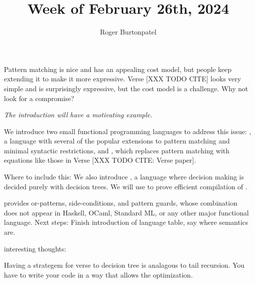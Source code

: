 \documentclass{article}
\title{Week of February 26th, 2024}
\author{Roger Burtonpatel}
\begin{document}
\maketitle

Pattern matching is nice and has an appealing cost model, but people keep
extending it to make it more expressive. Verse [XXX TODO CITE] looks very simple
and is surprisingly expressive, but the cost model is a challenge. Why not look
for a compromise?

\bigskip 
\it{The introduction will have a motivating example.}
\bigskip 



We introduce two small functional programming languages to address this issue:
\PPlus, a language with several of the popular extensions to pattern matching
and minimal syntactic restrictions, and \VMinus, which replaces pattern matching
with equations like those in Verse [XXX TODO CITE: Verse paper]. 

Where to include this: 
We also introduce \D, a language where decision making is decided purely with decision
trees. We will use \D to prove efficient compilation of \VMinus. 

\PPlus provides or-patterns, side-conditions, and pattern guards, whose
combination does not appear in Haskell, OCaml, Standard ML, or any other major
functional language. 
\bigskip
Next steps: Finish introduction of language table, say where semantics are. 

\bigskip
interesting thoughts: 

Having a strategem for verse to decision tree is analagous to tail recursion. 
You have to write your code in a way that allows the optimization. 




\end{document}
